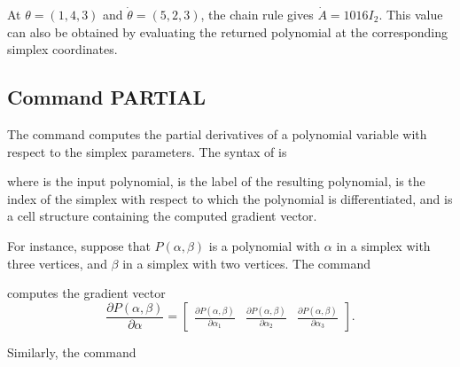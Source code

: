 \documentclass[english,11pt]{article}
\theoremstyle{break} \theorembodyfont{\small\rm}
\begin{document}

At $\theta=(1,4,3)$ and $\dot\theta=(5,2,3)$, the chain rule gives
$\dot A=1016I_2$. This value can also be obtained by evaluating the
returned polynomial at the corresponding simplex coordinates.

\subsection*{Command PARTIAL}

The command  computes the partial derivatives of a polynomial variable with respect
to the simplex parameters. The syntax of  is

\vspace{0.5cm}%
\noindent\begin{minipage}{\linewidth}
\end{minipage}
\vspace{0.2cm}

\noindent where  is the input polynomial,  is the label of the
resulting polynomial,  is the index of the simplex with respect to which the polynomial
is differentiated, and  is a cell structure containing the computed gradient vector.

For instance, suppose that $P(\alpha,\beta)$ is a polynomial with $\alpha$
in a simplex with three vertices, and $\beta$ in a simplex with two vertices. The command

\vspace{0.5cm}%
\noindent\begin{minipage}{\linewidth}
\end{minipage}
\vspace{0.2cm}

\noindent computes the gradient vector
\[
 \frac{\partial P(\alpha,\beta)}{\partial \alpha} =
 \begin{bmatrix}
    \displaystyle \frac{\partial P(\alpha,\beta)}{\partial \alpha_1} & \displaystyle \frac{\partial P(\alpha,\beta)}{\partial \alpha_2} & \displaystyle \frac{\partial P(\alpha,\beta)}{\partial \alpha_3}
 \end{bmatrix}.
\]

Similarly, the command

\vspace{0.5cm}%
\noindent\begin{minipage}{\linewidth}
\end{minipage}
\vspace{0.2cm}
\end{document}
